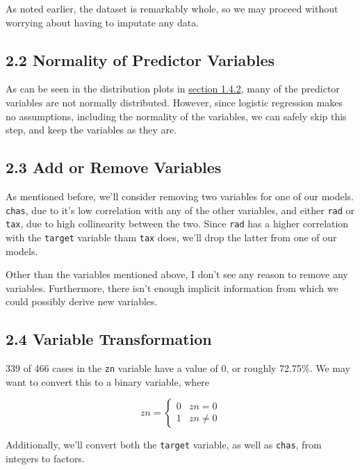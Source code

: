 \documentclass[]{article}
\begin{document}
As noted earlier, the dataset is remarkably whole, so we may proceed
without worrying about having to imputate any data.

\subsection{2.2 Normality of Predictor
Variables}\label{normality-of-predictor-variables}

As can be seen in the distribution plots in
\protect\hyperlink{histogram}{section 1.4.2}, many of the predictor
variables are not normally distributed. However, since logistic
regression makes no assumptions, including the normality of the
variables, we can safely skip this step, and keep the variables as they
are.

\subsection{2.3 Add or Remove Variables}\label{add-or-remove-variables}

As mentioned before, we'll consider removing two variables for one of
our models. \texttt{chas}, due to it's low correlation with any of the
other variables, and either \texttt{rad} or \texttt{tax}, due to high
collinearity between the two. Since \texttt{rad} has a higher
correlation with the \texttt{target} variable tham \texttt{tax} does,
we'll drop the latter from one of our models.

Other than the variables mentioned above, I don't see any reason to
remove any variables. Furthermore, there isn't enough implicit
information from which we could possibly derive new variables.

\hypertarget{variable-transformation}{\subsection{2.4 Variable
Transformation}\label{variable-transformation}}

339 of 466 cases in the \texttt{zn} variable have a value of 0, or
roughly 72.75\%. We may want to convert this to a binary variable, where

\[ zn = 
\begin{cases} 
      0 & zn = 0 \\
      1 & zn \neq 0
\end{cases}
\]

Additionally, we'll convert both the \texttt{target} variable, as well
as \texttt{chas}, from integers to factors.
\end{document}
